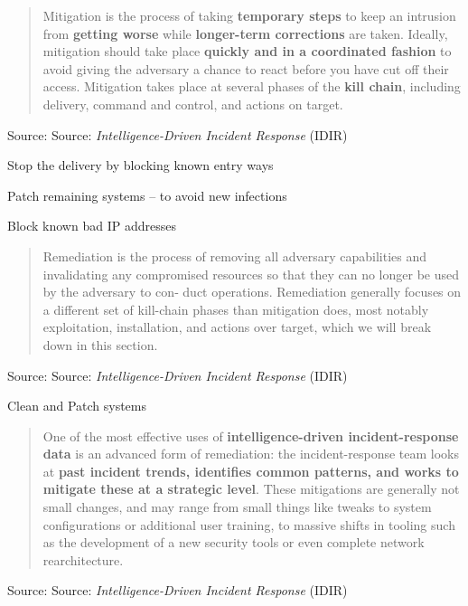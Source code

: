 \documentclass[Screen16to9,17pt]{foils}
\begin{document}


\begin{quote}
Mitigation is the process of taking {\bf temporary steps} to keep an intrusion from {\bf getting worse} while {\bf longer-term corrections} are taken. Ideally, mitigation should take place {\bf quickly and in a coordinated fashion} to avoid giving the adversary a chance to react before you have cut off their access. Mitigation takes place at several phases of the {\bf kill chain}, including delivery, command and control, and actions on target.
\end{quote}
Source: Source: \emph{Intelligence-Driven Incident Response} (IDIR)

\begin{list2}
\item Stop the delivery by blocking known entry ways
\item Patch remaining systems -- to avoid new infections
\item Block known bad IP addresses
\end{list2}




\begin{quote}
Remediation is the process of removing all adversary capabilities and invalidating any
compromised resources so that they can no longer be used by the adversary to con‐
duct operations. Remediation generally focuses on a different set of kill-chain phases
than mitigation does, most notably exploitation, installation, and actions over target,
which we will break down in this section.
\end{quote}
Source: Source: \emph{Intelligence-Driven Incident Response} (IDIR)

\begin{list2}
\item Clean and Patch systems
\end{list2}




\begin{quote}
One of the most effective uses of {\bf intelligence-driven incident-response data} is an
advanced form of remediation: the incident-response team looks at {\bf past incident
trends, identifies common patterns, and works to mitigate these at a strategic level}.
These mitigations are generally not small changes, and may range from small things
like tweaks to system configurations or additional user training, to massive shifts in
tooling such as the development of a new security tools or even complete network
rearchitecture.
\end{quote}
Source: Source: \emph{Intelligence-Driven Incident Response} (IDIR)
\end{document}
